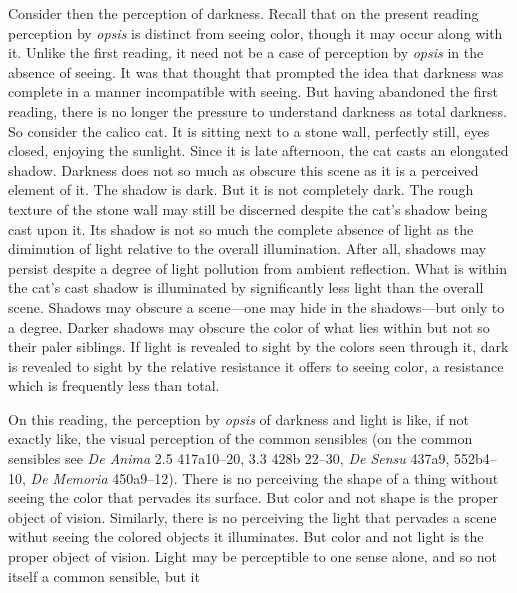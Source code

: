 Consider then the perception of darkness. Recall that on the present reading perception by \emph{opsis} is distinct from seeing color, though it may occur along with it. Unlike the first reading, it need not be a case of perception by \emph{opsis} in the absence of seeing. It was that thought that prompted the idea that darkness was complete in a manner incompatible with seeing. But having abandoned the first reading, there is no longer the pressure to understand darkness as total darkness. So consider the calico cat. It is sitting next to a stone wall, perfectly still, eyes closed, enjoying the sunlight. Since it is late afternoon, the cat casts an elongated shadow. Darkness does not so much as obscure this scene as it is a perceived element of it. The shadow is dark. But it is not completely dark. The rough texture of the stone wall may still be discerned despite the cat's shadow being cast upon it. Its shadow is not so much the complete absence of light as the diminution of light relative to the overall illumination. After all, shadows may persist despite a degree of light pollution from ambient reflection. What is within the cat's cast shadow is illuminated by significantly less light than the overall scene. Shadows may obscure a scene—one may hide in the shadows—but only to a degree. Darker shadows may obscure the color of what lies within but not so their paler siblings. If light is revealed to sight by the colors seen through it, dark is revealed to sight by the relative resistance it offers to seeing color, a resistance which is frequently less than total.

On this reading, the perception by \emph{opsis} of darkness and light is like, if not exactly like, the visual perception of the common sensibles (on the common sensibles see \emph{De Anima} 2.5 417a10–20, 3.3 428b 22–30, \emph{De Sensu} 437a9, 552b4–10, \emph{De Memoria} 450a9–12). There is no perceiving the shape of a thing without seeing the color that pervades its surface. But color and not shape is the proper object of vision. Similarly, there is no perceiving the light that pervades a scene withut seeing the colored objects it illuminates. But color and not light is the proper object of vision. Light may be perceptible to one sense alone, and so not itself a common sensible, but it 

